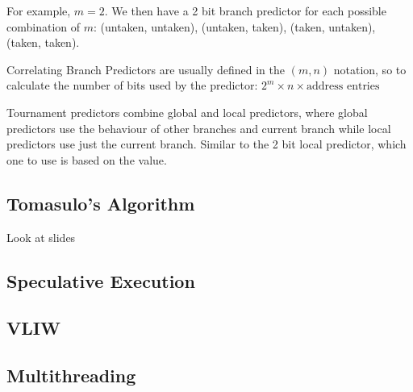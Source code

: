 \documentclass{article}
\theoremstyle{remark}
\begin{document}
For example, \(m=2\). We then have a 2 bit branch predictor for each possible combination of \(m\): (untaken, untaken), (untaken, taken), (taken, untaken), (taken, taken).

Correlating Branch Predictors are usually defined in the \((m, n)\) notation, so to calculate the number of bits used by the predictor: \(2^m \times n \times \text{address entries}\)

Tournament predictors combine global and local predictors, where global predictors use the behaviour of other branches and current branch while local predictors use just the current branch. Similar to the 2 bit local predictor, which one to use is based on the value.
\subsection{Tomasulo's Algorithm}
Look at slides
\subsection{Speculative Execution}

\subsection{VLIW}

\subsection{Multithreading}
\end{document}
